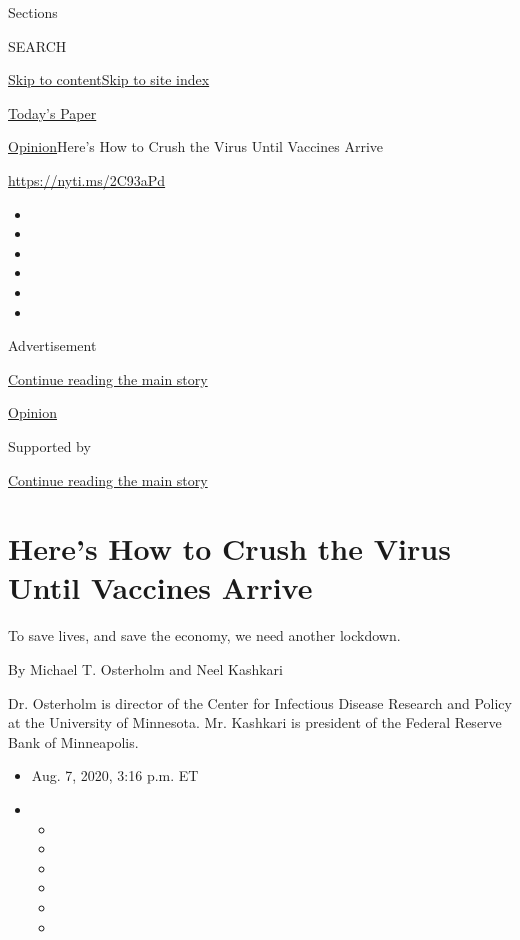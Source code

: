 Sections

SEARCH

\protect\hyperlink{site-content}{Skip to
content}\protect\hyperlink{site-index}{Skip to site index}

\href{https://myaccount.nytimes3xbfgragh.onion/auth/login?response_type=cookie\&client_id=vi}{}

\href{https://www.nytimes3xbfgragh.onion/section/todayspaper}{Today's
Paper}

\href{/section/opinion}{Opinion}\textbar{}Here's How to Crush the Virus
Until Vaccines Arrive

\href{https://nyti.ms/2C93aPd}{https://nyti.ms/2C93aPd}

\begin{itemize}
\item
\item
\item
\item
\item
\item
\end{itemize}

Advertisement

\protect\hyperlink{after-top}{Continue reading the main story}

\href{/section/opinion}{Opinion}

Supported by

\protect\hyperlink{after-sponsor}{Continue reading the main story}

\hypertarget{heres-how-to-crush-the-virus-until-vaccines-arrive}{%
\section{Here's How to Crush the Virus Until Vaccines
Arrive}\label{heres-how-to-crush-the-virus-until-vaccines-arrive}}

To save lives, and save the economy, we need another lockdown.

By Michael T. Osterholm and Neel Kashkari

Dr. Osterholm is director of the Center for Infectious Disease Research
and Policy at the University of Minnesota. Mr. Kashkari is president of
the Federal Reserve Bank of Minneapolis.

\begin{itemize}
\item
  Aug. 7, 2020, 3:16 p.m. ET
\item
  \begin{itemize}
  \item
  \item
  \item
  \item
  \item
  \item
  \end{itemize}
\end{itemize}

